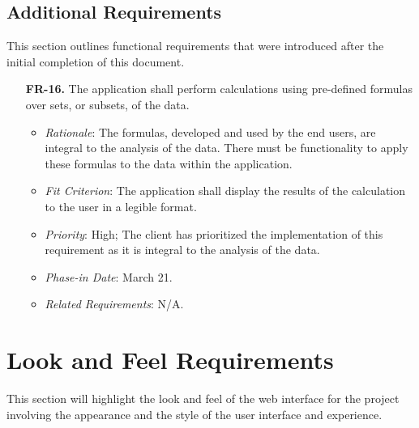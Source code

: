 \documentclass[12pt]{article}
\begin{document}
\subsection{Additional Requirements}
This section outlines functional requirements that were introduced after the
initial completion of this document.
\begin{enumerate}
  \item[\textbf{FR-16.}] The application shall perform calculations using
  pre-defined formulas over sets, or subsets, of the data.
  \begin{itemize}
    \item \textit{Rationale}: The formulas, developed and used by the end users,
    are integral to the analysis of the data. There must be functionality to
    apply these formulas to the data within the application.
    \item \textit{Fit Criterion}: The application shall display the results of
    the calculation to the user in a legible format.
    \item \textit{Priority}: High; The client has prioritized the implementation
    of this requirement as it is integral to the analysis of the data.
    \item \textit{Phase-in Date}: March 21. 
    \item \textit{Related Requirements}: N/A.
  \end{itemize}
\end{enumerate}

\section{Look and Feel Requirements}
This section will highlight the look and feel of the web interface for the
project involving the appearance and the style of the user interface and
experience.
\end{document}
